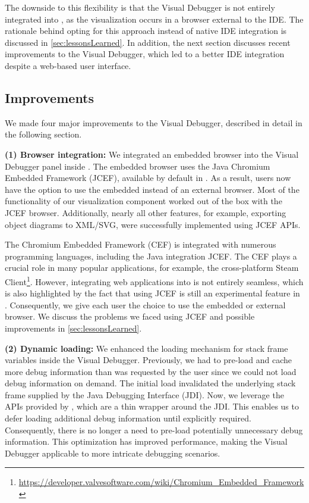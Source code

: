 \documentclass[sigconf]{acmart}
\begin{document}
The downside to this flexibility is that the Visual Debugger is not entirely integrated into \intellij{}, as the visualization occurs in a browser external to the IDE.
The rationale behind opting for this approach instead of native IDE integration is discussed in \autoref{sec:lessonsLearned}.
In addition, the next section discusses recent improvements to the Visual Debugger, which led to a better IDE integration despite a web-based user interface.

\subsection{Improvements} \label{subsec:improvements}
We made four major improvements to the Visual Debugger, described in detail in the following section.

\textbf{(1) Browser integration:} We integrated an embedded browser into the Visual Debugger panel inside \intellij{}.
The embedded browser uses the Java Chromium Embedded Framework (JCEF), available by default in \intellij{}.
As a result, users now have the option to use the embedded instead of an external browser.
Most of the functionality of our visualization component worked out of the box with the JCEF browser.
Additionally, nearly all other features, for example, exporting object diagrams to XML/SVG, were successfully implemented using JCEF APIs.

The Chromium Embedded Framework (CEF) \cite{marshallgreenblattChromiumEmbeddedFramework2023} is integrated with numerous programming languages, including the Java integration JCEF.
The CEF plays a crucial role in many popular applications, for example, the cross-platform Steam Client\footnote{\url{https://developer.valvesoftware.com/wiki/Chromium_Embedded_Framework}}.
However, integrating web applications into \intellij{} is not entirely seamless, which is also highlighted by the fact that using JCEF is still an experimental feature in \intellij{}.
Consequently, we give each user the choice to use the embedded or external browser.
We discuss the problems we faced using JCEF and possible improvements in \autoref{sec:lessonsLearned}.

\textbf{(2) Dynamic loading:} We enhanced the loading mechanism for stack frame variables inside the Visual Debugger.
Previously, we had to pre-load and cache more debug information than was requested by the user since we could not load debug information on demand.
The initial load invalidated the underlying stack frame supplied by the Java Debugging Interface (JDI).
Now, we leverage the APIs provided by \intellij{}, which are a thin wrapper around the JDI.
This enables us to defer loading additional debug information until explicitly required.
Consequently, there is no longer a need to pre-load potentially unnecessary debug information.
This optimization has improved performance, making the Visual Debugger applicable to more intricate debugging scenarios.
\end{document}
